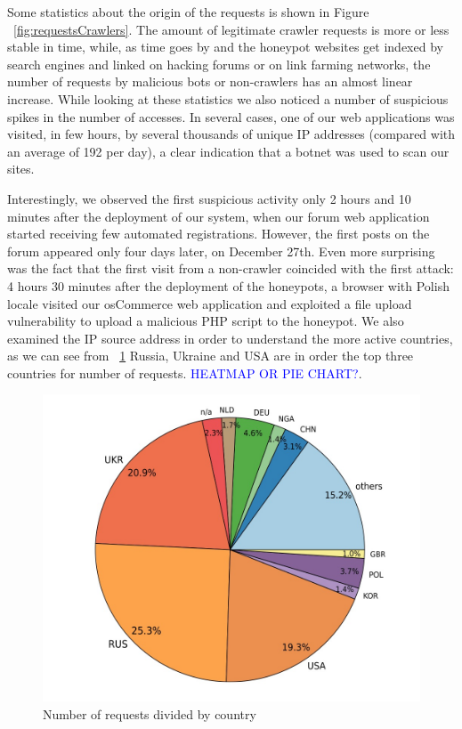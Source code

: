 Some statistics about the origin of the requests is shown in Figure ~\ref{fig:requestsCrawlers}. The amount of legitimate crawler requests is more or less stable in time, while, as time goes by and the honeypot websites get indexed by search engines and linked on hacking forums or on link farming networks, the number of requests by malicious bots or non-crawlers has an almost linear increase.
While looking at these statistics we also noticed a number of suspicious spikes in the number of accesses. In several cases, one of our web applications was visited, in few hours, by several thousands of unique IP addresses (compared with an average of 192 per day), a clear indication that a botnet was used to scan our sites.

Interestingly, we observed the first suspicious activity only 2 hours and 10 minutes after the deployment of our system, when our forum web application started receiving few automated registrations. However, the first posts on the forum appeared only four days later, on December 27th. Even more surprising was the fact that the first visit from a non-crawler coincided with the first attack: 4 hours 30 minutes after the deployment of the honeypots, a browser with Polish locale visited our osCommerce web application and exploited a file upload vulnerability to upload a malicious PHP script to the honeypot. We also examined the IP source address in order to understand the more active countries, as we can see from ~\ref{fig:requests_countries} Russia, Ukraine and USA are in order the top three countries for number of requests. \textcolor{blue}{HEATMAP OR PIE CHART?}.

\begin{figure}[tbh]
\centerline{\includegraphics[scale=0.5]{Images/requests_countries.jpg}}
\caption{Number of requests divided by country\label{fig:requests_countries}}
\end{figure}

